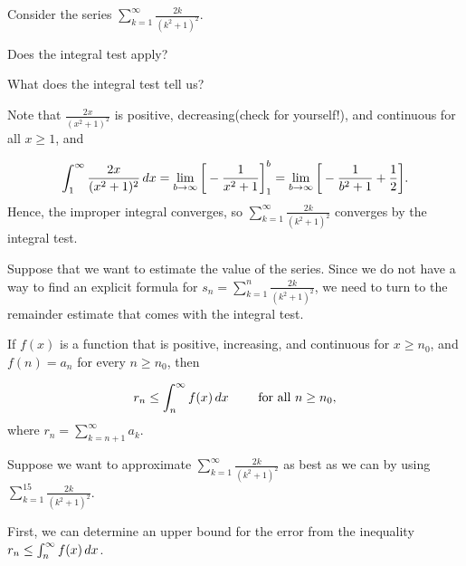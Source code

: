 \documentclass{ximera}
\author{Jim Talamo}
\begin{document}
\begin{exercise}

Consider the series $\sum_{k=1}^{\infty} \frac{2k}{(k^2+1)^2}$.  

Does the integral test apply?

\begin{multipleChoice}
\end{multipleChoice}

What does the integral test tell us?
\begin{multipleChoice}
\end{multipleChoice}

\begin{feedback}
Note that $\frac{2x}{(x^2+1)^2}$ is positive, decreasing(check for yourself!), and continuous for all $x \geq 1$, and

\[
\int_1^\infty \frac{2x}{(x^2+1)^2} \d x = \lim_{b \to \infty} \eval{-\frac{1}{x^2+1}}_1^b = \lim_{b \to \infty} \eval{-\frac{1}{b^2+1}+\frac{1}{2}}.
\]
Hence, the improper integral converges, so $\sum_{k=1}^{\infty}  \frac{2k}{(k^2+1)^2}$ converges by the integral test.  

Suppose that we want to estimate the value of the series.  Since we do not have a way to find an explicit formula for $s_n=\sum_{k=1}^n \frac{2k}{(k^2+1)^2}$, we need to turn to the remainder estimate that comes with the integral test.

\begin{theorem}
If $f(x)$ is a function that is positive, increasing, and continuous for $x \geq n_0$,  and $f(n) = a_n$ for every $n \geq n_0$, then 

\[
 r_n \leq \int_{n}^{\infty} f(x) \,d x \qquad \textrm{ for all } n \geq n_0,
\]
where $r_n = \sum_{k=n+1}^{\infty} a_k$.
\end{theorem}

\end{feedback}


\begin{exercise}
Suppose we want to approximate $\sum_{k=1}^{\infty} \frac{2k}{(k^2+1)^2}$ as best as we can by using $\sum_{k=1}^{15} \frac{2k}{(k^2+1)^2}$.  

First, we can determine an upper bound for the error from the inequality $ r_n \leq \int_{n}^{\infty} f(x) \,d x$. 


\end{exercise}
\end{exercise}
\end{document}
